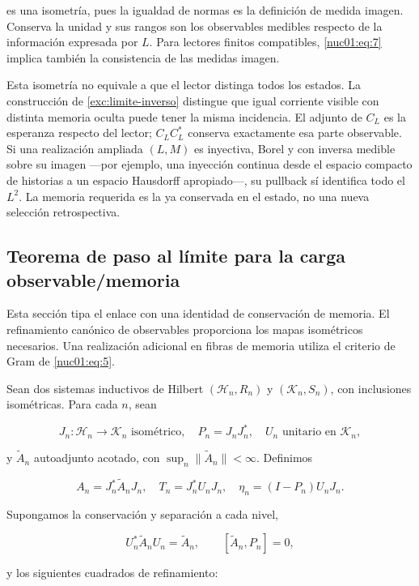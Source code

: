 es una isometría, pues la igualdad de normas es la definición de medida imagen. Conserva la unidad y sus rangos son los observables medibles respecto de la información expresada por \(L\). Para lectores finitos compatibles, \eqref{nuc01:eq:7} implica también la consistencia de las medidas imagen.

Esta isometría no equivale a que el lector distinga todos los estados. La construcción de \cref{exc:limite-inverso} distingue que igual corriente visible con distinta memoria oculta puede tener la misma incidencia. El adjunto de \(C_L\) es la esperanza respecto del lector; \(C_LC_L^*\) conserva exactamente esa parte observable. Si una realización ampliada \((L,M)\) es inyectiva, Borel y con inversa medible sobre su imagen —por ejemplo, una inyección continua desde el espacio compacto de historias a un espacio Hausdorff apropiado—, su pullback sí identifica todo el \(L^2\). La memoria requerida es la ya conservada en el estado, no una nueva selección retrospectiva.

\subsection{Teorema de paso al límite para la carga observable/memoria}

Esta sección tipa el enlace con una identidad de conservación de memoria. El refinamiento canónico de observables proporciona los mapas isométricos necesarios. Una realización adicional en fibras de memoria utiliza el criterio de Gram de \eqref{nuc01:eq:5}.

Sean dos sistemas inductivos de Hilbert \((\mathscr H_n,R_n)\) y \((\mathscr K_n,S_n)\), con inclusiones isométricas. Para cada \(n\), sean

\[
J_n:\mathscr H_n\to\mathscr K_n\text{ isométrico},\quad
P_n=J_nJ_n^*,\quad U_n\text{ unitario en }\mathscr K_n,
\]

y \(\widetilde A_n\) autoadjunto acotado, con \(\sup_n\|\widetilde A_n\|<\infty\). Definimos

\[
A_n=J_n^*\widetilde A_nJ_n,\quad
T_n=J_n^*U_nJ_n,\quad
\eta_n=(I-P_n)U_nJ_n.
\]

Supongamos la conservación y separación a cada nivel,

\begin{equation}
U_n^*\widetilde A_nU_n=\widetilde A_n,
\qquad [\widetilde A_n,P_n]=0,
\label{nuc01:eq:8}
\end{equation}

y los siguientes cuadrados de refinamiento:

